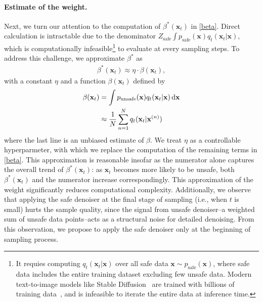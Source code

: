 %

%
%


%

%

%
%
%
%
%
%
%

%


%

%
%
%
%
%
%
%
%
%
%
%
%
%
%
%
%
%

%
%
%
%
%
%



%

%

%

%
%

%

%

%


%
%
%
%
%
%
%
%
%
%
%
%


\paragraph{Estimate of the weight.}
Next, we turn our attention to the computation of $\beta^{*}(\mathbf{x}_{t})$ in \eqref{beta}. Direct calculation is intractable due to the denominator $Z_{\text{safe}}\int p_{\text{safe}}(\mathbf{x})q_{t}(\mathbf{x}_{t}\vert\mathbf{x})$, which is computationally infeasible\footnote{It requies computing $q_{t}(\mathbf{x}_{t}\vert\mathbf{x})$ over all safe data $\mathbf{x}\sim p_{\text{safe}}(\mathbf{x})$, where safe data includes the entire training dataset excluding few unsafe data. Modern text-to-image models like Stable Diffusion~\cite{rombach2022high} are trained with billions of training data~\cite{schuhmann2022laion}, and is infeasible to iterate the entire data at inference time.} to evaluate at every sampling steps. 
%
To address this challenge, 
we approximate $\beta^*$ as
\begin{align*}
    \beta^*(\mathbf{x}_{t}) \approx \eta \cdot \beta(\mathbf{x}_{t}),
\end{align*}
with a constant $\eta$ and a function $\beta(\mathbf{x}_{t})$ defined by
%
\begin{align}
    \beta(\mathbf{x}_{t})&=\int p_{\text{unsafe}}(\mathbf{x})q_{t}(\mathbf{x}_{t}\vert\mathbf{x})\mathop{}\!\mathrm{d}\mathbf{x}\nonumber \\
    &\approx \frac{1}{N}\sum_{n=1}^{N}q_{t}(\mathbf{x}_{t}\vert\mathbf{x}^{(n)}) \nonumber 
\end{align} where the last line is an unbiased estimate of $\beta$. We treat $\eta$ as a controllable hyperparmeter, with which we replace the computation of the remaining terms in \eqref{beta}. 
%
This approximation is reasonable insofar as the numerator alone captures the overall trend of $\beta^{*}(\mathbf{x}_{t})$: as $\mathbf{x}_{t}$ becomes more likely to be unsafe, both $\beta^{*}(\mathbf{x}_{t})$ and the numerator increase correspondingly. This approximation of the weight significantly reduces computational complexity. Additionally, we observe that applying the safe denoiser at the final stage of sampling (i.e., when $t$ is small) hurts the sample quality, since the signal from unsafe denoiser--a weighted sum of unsafe data points--acts as a structural noise for detailed denoising. From this observation, we propose to apply the safe denoiser only at the beginning of sampling process.
%

